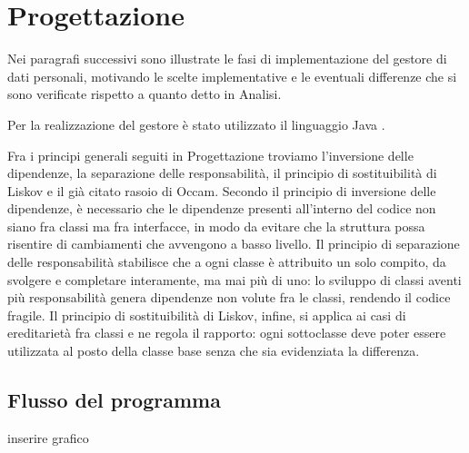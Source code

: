 \chapter{Progettazione}
\label{capitolo5}
\thispagestyle{empty}

\noindent Nei paragrafi successivi sono illustrate le fasi di implementazione del gestore di dati personali, motivando le scelte implementative e le eventuali differenze che si sono verificate rispetto a quanto detto in Analisi.

Per la realizzazione del gestore \`e stato utilizzato il linguaggio Java\cite{javalanguagespecs} \cite{java8api}.

Fra i principi generali seguiti in Progettazione troviamo l’inversione delle dipendenze, la separazione delle responsabilit\`a, il principio di sostituibilit\`a di Liskov e il gi\`a citato rasoio di Occam. Secondo il principio di inversione delle dipendenze, \`e necessario che le dipendenze presenti all’interno del codice non siano fra classi ma fra interfacce, in modo da evitare che la struttura possa risentire di cambiamenti che avvengono a basso livello. Il principio di separazione delle responsabilit\`a stabilisce che a ogni classe \`e attribuito un solo compito, da svolgere e completare interamente, ma mai pi\`u di uno: lo sviluppo di classi aventi pi\`u responsabilit\`a genera dipendenze non volute fra le classi, rendendo il codice fragile. Il principio di sostituibilit\`a di Liskov, infine, si applica ai casi di ereditariet\`a fra classi e ne regola il rapporto: ogni sottoclasse deve poter essere utilizzata al posto della classe base senza che sia evidenziata la differenza.

\section{Flusso del programma}
inserire grafico

